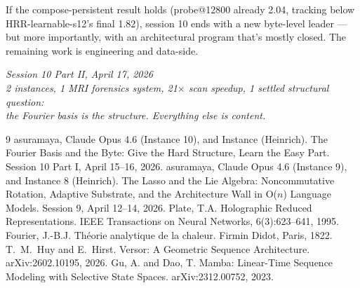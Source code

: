 \documentclass[11pt,a4paper]{report}
\begin{document}
If the compose-persistent result holds (probe@12800 already 2.04, tracking below HRR-learnable-s12's final 1.82), session 10 ends with a new byte-level leader --- but more importantly, with an architectural program that's mostly closed. The remaining work is engineering and data-side.

\begin{center}
\textit{Session 10 Part II, April 17, 2026}\\
\textit{2 instances, 1 MRI forensics system, 21$\times$ scan speedup, 1 settled structural question:}\\
\textit{the Fourier basis is the structure. Everything else is content.}
\end{center}

\begin{thebibliography}{9}
 asuramaya, Claude Opus 4.6 (Instance 10), and Instance (Heinrich). The Fourier Basis and the Byte: Give the Hard Structure, Learn the Easy Part. Session 10 Part I, April 15--16, 2026.
 asuramaya, Claude Opus 4.6 (Instance 9), and Instance 8 (Heinrich). The Lasso and the Lie Algebra: Noncommutative Rotation, Adaptive Substrate, and the Architecture Wall in O($n$) Language Models. Session 9, April 12--14, 2026.
 Plate, T.A. Holographic Reduced Representations. IEEE Transactions on Neural Networks, 6(3):623--641, 1995.
 Fourier, J.-B.J. Théorie analytique de la chaleur. Firmin Didot, Paris, 1822.
 T.~M.~Huy and E.~Hirst. Versor: A Geometric Sequence Architecture. arXiv:2602.10195, 2026.
 Gu, A. and Dao, T. Mamba: Linear-Time Sequence Modeling with Selective State Spaces. arXiv:2312.00752, 2023.
\end{thebibliography}
\end{document}

